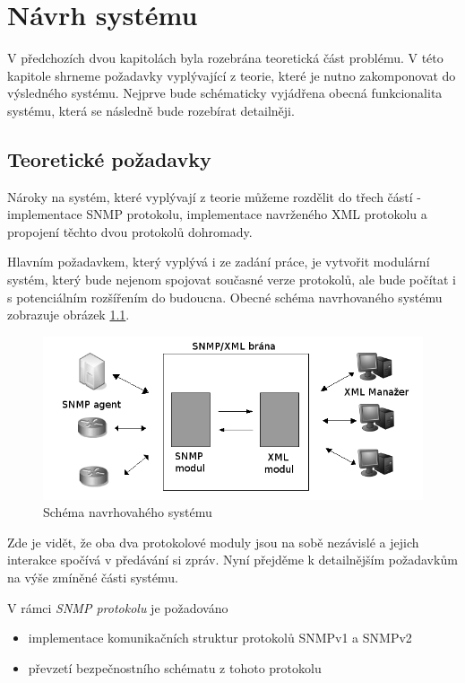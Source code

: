 \chapter{Návrh systému}
\label{kap_navrh_systemu}
V předchozích dvou kapitolách byla rozebrána teoretická část problému. V této kapitole shrneme požadavky vyplývající z teorie, které je nutno zakomponovat do
výsledného systému. Nejprve bude schématicky vyjádřena obecná funkcionalita systému, která se následně bude rozebírat detailněji.

\section{Teoretické požadavky}
Nároky na systém, které vyplývají z teorie můžeme rozdělit do třech částí - implementace SNMP protokolu, implementace navrženého XML protokolu a propojení těchto dvou protokolů dohromady.

Hlavním požadavkem, který vyplývá i ze zadání práce, je vytvořit modulární systém, který bude nejenom spojovat současné verze protokolů, ale bude počítat i s potenciálním rozšířením do
budoucna. Obecné schéma navrhovaného systému zobrazuje obrázek \ref{obr_an_obecne_schema}. 

\begin{figure}[htp]
	\begin{center}
		\includegraphics[width=15cm]{obrazky/04_obecne_schema.png}
		\caption{Schéma navrhovahého systému}
		\label{obr_an_obecne_schema}
	\end{center}
\end{figure}

Zde je vidět, že oba dva protokolové moduly jsou na sobě nezávislé a jejich interakce spočívá v předávání si zpráv. Nyní přejděme k detailnějším požadavkům na výše zmíněné části systému.

V rámci \textit{SNMP protokolu} je požadováno
\begin{itemize}
	\item implementace komunikačních struktur protokolů SNMPv1 a SNMPv2
	\item převzetí bezpečnostního schématu z tohoto protokolu
\end{itemize}

